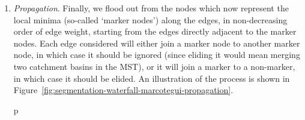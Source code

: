 \begin{enumerate}
\item \emph{Propagation}. Finally, we flood out from the nodes which now represent the local minima (so-called `marker nodes') along the edges, in non-decreasing order of edge weight, starting from the edges directly adjacent to the marker nodes. Each edge considered will either join a marker node to another marker node, in which case it should be ignored (since eliding it would mean merging two catchment basins in the MST), or it will join a marker to a non-marker, in which case it should be elided. An illustration of the process is shown in Figure~\ref{fig:segmentation-waterfall-marcotegui-propagation}.

\begin{stusubfig}{p}
	\hspace{4mm}%
	\hspace{4mm}%

\end{stusubfig}
\end{enumerate}
